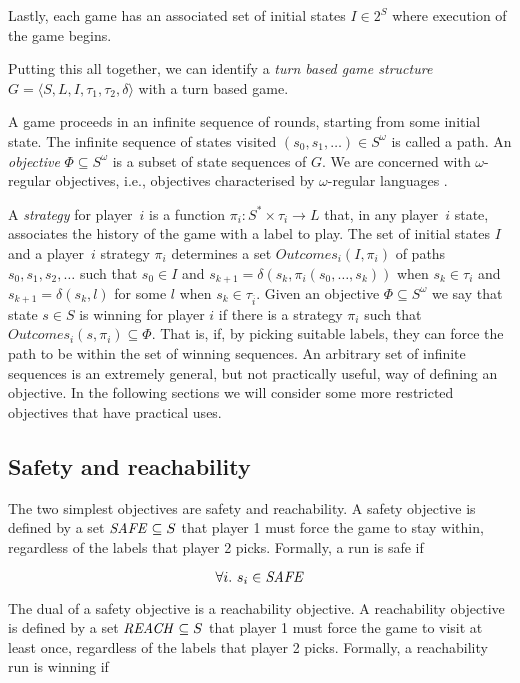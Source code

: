 Lastly, each game has an associated set of initial states $I \in 2^S$ where execution of the game begins.

Putting this all together, we can identify a \emph{turn based game structure} $G = \langle S,L,I,\tau_1,\tau_2,\delta \rangle$ with a turn based game.

A game proceeds in an infinite sequence of rounds, starting from some initial state. The infinite sequence of states visited $(s_0, s_1,\ldots) \in S^\omega$ is called a path. An \emph{objective} $\Phi \subseteq S^\omega$ is a subset of state sequences of $G$. We are concerned with $\omega$-regular objectives, i.e., objectives characterised by $\omega$-regular languages \cite{omega_reg_lang}. 

A \emph{strategy} for player~$i$ is a function $\pi_i : S^* \times \tau_i \rightarrow L$ that, in any player~$i$ state, associates the history of the game with a label to play. The set of initial states $I$ and a player~$i$ strategy $\pi_i$ determines a set $Outcomes_i(I, \pi_i)$ of paths $s_0, s_1, s_2, \ldots $ such that $s_0 \in I$ and $s_{k+1} = \delta(s_k, \pi_i(s_0,\ldots,s_k))$ when $s_k \in \tau_i$ and $s_{k+1} = \delta(s_k, l)$ for some $l$ when $s_k \in \tau_{\overline{i}}$.  Given an objective $\Phi \subseteq S^\omega$ we say that state $s \in S$ is winning for player $i$ if there is a strategy $\pi_i$ such that $Outcomes_i({s}, \pi_i) \subseteq \Phi$. That is, if, by picking suitable labels, they can force the path to be within the set of winning sequences. An arbitrary set of infinite sequences is an extremely general, but not practically useful, way of defining an objective. In the following sections we will consider some more restricted objectives that have practical uses.

\subsection{Safety and reachability}

The two simplest objectives are safety and reachability. A safety objective is defined by a set $\mathit{SAFE} \subseteq S$ that player 1 must force the game to stay within, regardless of the labels that player 2 picks. Formally, a run is safe if 

\begin{equation}
\label{eqn:safeobj}
\forall i.\ s_i \in \mathit{SAFE}
\end{equation}

The dual of a safety objective is a reachability objective. A reachability objective is defined by a set $\mathit{REACH} \subseteq S$ that player 1 must force the game to visit at least once, regardless of the labels that player 2 picks. Formally, a reachability run is winning if 

